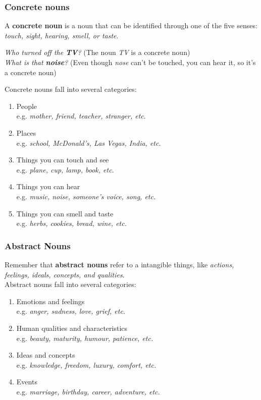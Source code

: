 \documentclass[hidelinks,10pt,a4paper]{article}
\begin{document}
\subsubsection{Concrete nouns}
A \textbf{concrete noun} is a noun that can be identified through one of the five senses: \textit{touch, sight, hearing, smell, or taste}.
\begin{center}
		\textit{Who turned off the \textbf{TV}?} (The noun \textit{TV} is a concrete noun)\\
		\textit{What is that \textbf{noise}?} (Even though \textit{nose} can't be touched, you can hear it, so it's a concrete noun)
\end{center}
Concrete nouns fall into several categories:
\begin{enumerate}[label=\alph*)]
		\item People\\
				e.g. \textit{mother, friend, teacher, stranger, etc}.
		\item Places\\
				e.g. \textit{school, McDonald's, Las Vegas, India, etc}.
		\item Things you can touch and see\\
				e.g. \textit{plane, cup, lamp, book, etc}.
		\item Things you can hear\\
				e.g. \textit{music, noise, someone's voice, song, etc.}
		\item Things you can smell and taste\\
				e.g. \textit{herbs, cookies, bread, wine, etc.}
\end{enumerate}

\subsubsection{Abstract Nouns}
Remember that \textbf{abstract nouns} refer to a intangible things, like \textit{actions, feelings, ideals, concepts, and qualities}.\\
Abstract nouns fall into several categories:
\begin{enumerate}[label=\alph*)]
		\item Emotions and feelings\\
				e.g. \textit{anger, sadness, love, grief, etc.}
		\item Human qualities and characteristics\\
				e.g. \textit{beauty, maturity, humour, patience, etc.}
		\item Ideas and concepts\\
				e.g. \textit{knowledge, freedom, luxury, comfort, etc.}
		\item Events\\
				e.g. \textit{marriage, birthday, career, adventure, etc.}
\end{enumerate}
\end{document}
